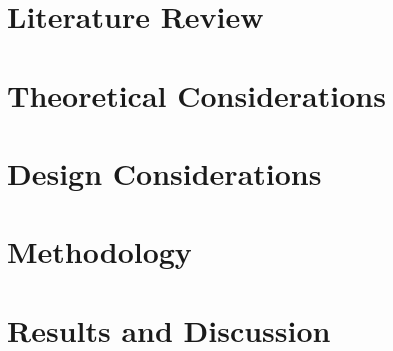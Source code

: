 \chapter{Literature Review} 
\label{ch:litrev} 
\startcontents[chapters]
\begin{SingleSpace}	
	\Mprintcontents 
\end{SingleSpace}

\stopcontents[chapters]
\cleardoublepage

\chapter{Theoretical Considerations}
\label{ch:theorycon}
\startcontents[chapters]
\begin{SingleSpace}	
	\Mprintcontents 
\end{SingleSpace}

\stopcontents[chapters]
\cleardoublepage

\chapter{Design Considerations} 
\label{ch:designcon} 
\startcontents[chapters]
\begin{SingleSpace}	
	\Mprintcontents 
\end{SingleSpace}

\stopcontents[chapters]
\cleardoublepage

\chapter{Methodology} 
\label{ch:method} 
\startcontents[chapters]
\begin{SingleSpace}	
	\Mprintcontents 
\end{SingleSpace}

\stopcontents[chapters]
\cleardoublepage

\ifResultDiscuss 
	\chapter{Results and Discussion} 
	\label{ch:result_discuss} 
	\startcontents[chapters]
	\begin{SingleSpace}	
		\Mprintcontents 
	\end{SingleSpace}
	
	\stopcontents[chapters]
	\cleardoublepage
\fi

